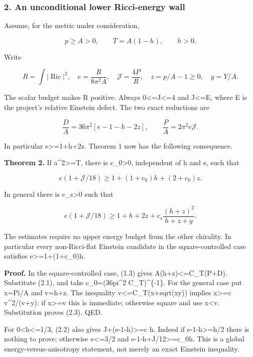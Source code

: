 \documentclass[
  10pt,
]{article}
\begin{document}
\hypertarget{an-unconditional-lower-ricci-energy-wall}{%
\subsubsection{2. An unconditional lower Ricci-energy
wall}\label{an-unconditional-lower-ricci-energy-wall}}

Assume, for the metric under consideration,

\[
 p\ge A>0,\qquad T=A(1-h),\qquad h>0.
\]

Write

\[
 R=\int|\operatorname{Ric}|^2,\quad
 e=\frac{R}{8\pi^2A},\quad
 \mathcal J=\frac{4P}{R},\quad z=p/A-1\ge0,\quad y=Y/A.
\]

The scalar budget makes R positive. Always 0\textless=J\textless=4 and
J\textless=E, where E is the project's relative Einstein defect. The two
exact reductions are

\[
 \frac DA=36\pi^2[e-1-h-2z],\qquad
 \frac PA=2\pi^2e\mathcal J.                           \tag{2.1}
\]

In particular e\textgreater=1+h+2z. Theorem 1 now has the following
consequence.

\textbf{Theorem 2.} If a\^{}2\textgreater=T, there is c\_0\textgreater0,
independent of h and e, such that

\[
 \boxed{e(1+\mathcal J/18)
       \ge1+(1+c_0)h+(2+c_0)z.}                       \tag{2.2}
\]

In general there is c\_s\textgreater0 such that

\[
 \boxed{e(1+\mathcal J/18)
       \ge1+h+2z+c_s\frac{(h+z)^2}{h+z+y}.}            \tag{2.3}
\]

The estimates require no upper energy budget from the other chirality.
In particular every non-Ricci-flat Einstein candidate in the
square-controlled case satisfies e\textgreater=1+(1+c\_0)h.

\textbf{Proof.} In the square-controlled case, (1.3) gives
A(h+z)\textless=C\_T(P+D). Substitute (2.1), and take c\_0=(36pi\^{}2
C\_T)\^{}\{-1\}. For the general case put x=Pi/A and v=h+z. The
inequality v\textless=C\_T(x+sqrt(xy)) implies x\textgreater=c
v\^{}2/(v+y): if x\textgreater=v this is immediate; otherwise square and
use x\textless v. Substitution proves (2.3). QED.

For 0\textless h\textless=1/3, (2.2) also gives J+(e-1-h)\textgreater=c
h. Indeed if e-1-h\textgreater=h/2 there is nothing to prove; otherwise
e\textless=3/2 and e-1-h+J/12\textgreater=c\_0h. This is a global
energy-versus-anisotropy statement, not merely an exact Einstein
inequality.
\end{document}
